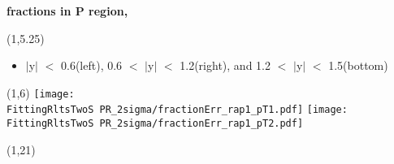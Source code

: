 \documentclass[11pt,slidescentered,red,compress,handout,hyperref={bookmarks=true},mathseriftable]{beamer}
\newcommand{\lpsi}{\ell_{\psi}}
\newcommand{\FittingRltsOneS}{../Psi1S/Fit/parameter/evaluateCtau/}
\newcommand{\FittingRltsTwoS}{../Psi2S/Fit/parameter/evaluateCtau/}
\begin{document}
\begin{frame}[t]{\small \bf fractions in P region,  }{}
\begin{textblock}{48}(1,5.25)
\begin{itemize}
\scriptsize \item $|$y$|$ $<$ 0.6(left), 0.6 $<$ $|$y$|$ $<$ 1.2(right), and 1.2 $<$ $|$y$|$ $<$ 1.5(bottom)
\end{itemize}
\end{textblock}
\begin{textblock}{48}(1,6)
\hspace*{10pt} \texttt{[image: \\FittingRltsTwoS PR\_2sigma/fractionErr\_rap1\_pT1.pdf]}
\hspace*{10pt} \texttt{[image: \\FittingRltsTwoS PR\_2sigma/fractionErr\_rap1\_pT2.pdf]}
\begin{textblock}{48}(1,21)
\end{textblock}
\end{textblock}
\end{frame}


\end{document}
